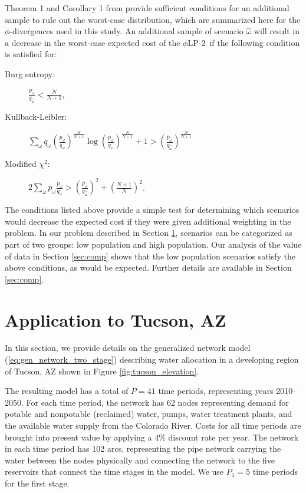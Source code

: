 \documentclass[opre,nonblindrev]{informs3} %
\newcommand{\plp}{$\phi$LP-2}
\begin{document}
Theorem 1 and Corollary 1 from \citep{love2013phi} provide sufficient conditions for an additional sample to rule out the worst-case distribution, which are summarized here for the $\phi$-divergences used in this study.
An additional sample of scenario $\hat{\omega}$ will result in a decrease in the worst-case expected cost of the \plp\ if the following condition is satisfied for:
	\begin{description}
		\item[Burg entropy:] $\frac{p_{\hat{\omega}}}{q_{\hat{\omega}}} < \frac{N}{N+1}$,
		\item[Kullback-Leibler:] $\sum_\omega q_\omega \left(\frac{p_\omega}{q_\omega}\right)^\frac{N}{N+1} \log\left(\frac{p_\omega}{q_\omega}\right)^\frac{N}{N+1} + 1 > \left(\frac{p_{\hat{\omega}}}{q_{\hat{\omega}}}\right)^\frac{N}{N+1}$
		\item[Modified $\chi^2$:] $2 \sum_\omega p_\omega \frac{p_\omega}{q_\omega} > \left(\frac{p_{\hat{\omega}}}{q_{\hat{\omega}}}\right)^2 + \left(\frac{N+1}{N}\right)^2$.
	\end{description}

The conditions listed above provide a simple test for determining which scenarios would decrease the expected cost if they were given additional weighting in the problem.
In our problem described in Section \ref{sec:water}, scenarios can be categorized as part of two groups: low population and high population.
Our analysis of the value of data in Section \ref{sec:comp} shows that the low population scenarios satisfy the above conditions, as would be expected.
Further details are available in Section \ref{sec:comp}.



\section{Application to Tucson, AZ}
\label{sec:water}

In this section, we provide details on the generalized network model (\ref{eq:gen_network_two_stage}) describing water allocation in a developing region of Tucson, AZ shown in Figure \ref{fig:tucson_elevation}.

The resulting model has a total of $P = 41$ time periods, representing years 2010--2050.
For each time period, the network has 62 nodes representing demand for potable and nonpotable (reclaimed) water, pumps, water treatment plants, and the available water supply from the Colorado River.
Costs for all time periods are brought into present value by applying a 4\% discount rate per year.
The network in each time period has 102 arcs, representing the pipe network carrying the water between the nodes physically and connecting the network to the five reservoirs that connect the time stages in the model.
We use $P_1 = 5$ time periods for the first stage.
\end{document}
